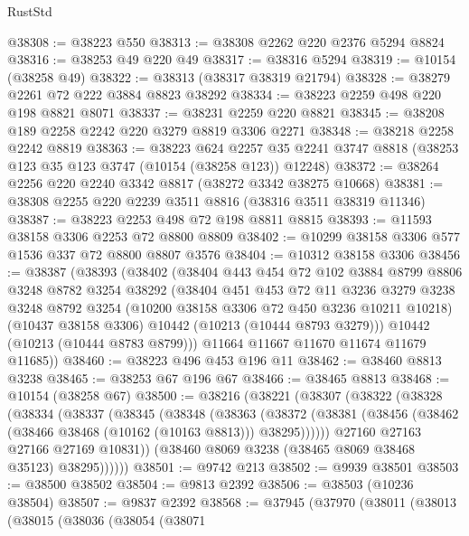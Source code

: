 \begin{lexlean}{RustStd}
\begin{coremodule}
@38308 := @38223 @550
@38313 := @38308 @2262 @220 @2376 @5294 @8824
@38316 := @38253 @49 @220 @49
@38317 := @38316 @5294
@38319 := @10154 (@38258 @49)
@38322 := @38313 (@38317 @38319 @21794)
@38328 := @38279 @2261 @72 @222 @3884 @8823 @38292
@38334 := @38223 @2259 @498 @220 @198 @8821 @8071
@38337 := @38231 @2259 @220 @8821
@38345 := @38208 @189 @2258 @2242 @220 @3279 @8819 @3306 @2271
@38348 := @38218 @2258 @2242 @8819
@38363 := @38223
    @624
    @2257
    @35
    @2241
    @3747
    @8818
    (@38253 @123 @35 @123 @3747 (@10154 (@38258 @123)) @12248)
@38372 := @38264 @2256 @220 @2240 @3342 @8817 (@38272 @3342 @38275 @10668)
@38381 := @38308 @2255 @220 @2239 @3511 @8816 (@38316 @3511 @38319 @11346)
@38387 := @38223 @2253 @498 @72 @198 @8811 @8815
@38393 := @11593 @38158 @3306 @2253 @72 @8800 @8809
@38402 := @10299 @38158 @3306 @577 @1536 @337 @72 @8800 @8807 @3576
@38404 := @10312 @38158 @3306
@38456 := @38387
    (@38393
      (@38402
        (@38404
          @443
          @454
          @72
          @102
          @3884
          @8799
          @8806
          @3248
          @8782
          @3254
          @38292
          (@38404
            @451
            @453
            @72
            @11
            @3236
            @3279
            @3238
            @3248
            @8792
            @3254
            (@10200 @38158 @3306 @72 @450 @3236 @10211 @10218)
            (@10437 @38158 @3306)
            @10442
            (@10213 (@10444 @8793 @3279)))
          @10442
          (@10213 (@10444 @8783 @8799)))
        @11664
        @11667
        @11670
        @11674
        @11679
        @11685))
@38460 := @38223 @496 @453 @196 @11
@38462 := @38460 @8813 @3238
@38465 := @38253 @67 @196 @67
@38466 := @38465 @8813
@38468 := @10154 (@38258 @67)
@38500 := @38216
    (@38221
      (@38307
        (@38322
          (@38328
            (@38334
              (@38337
                (@38345
                  (@38348
                    (@38363
                      (@38372
                        (@38381 (@38456 (@38462 (@38466 @38468 (@10162 (@10163 @8813))) @38295))))))
                  @27160
                  @27163
                  @27166
                  @27169
                  @10831))
              (@38460 @8069 @3238 (@38465 @8069 @38468 @35123) @38295))))))
@38501 := @9742 @213
@38502 := @9939 @38501
@38503 := @38500 @38502
@38504 := @9813 @2392
@38506 := @38503 (@10236 @38504)
@38507 := @9837 @2392
@38568 := @37945
    (@37970
      (@38011
        (@38013
          (@38015
            (@38036
              (@38054
                (@38071

\end{coremodule}
\end{lexlean}
